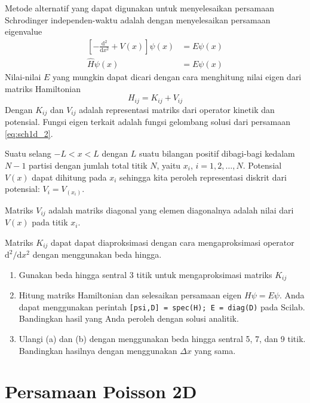 \documentclass[12pt,bahasa]{article}
\begin{document}
Metode alternatif
yang dapat digunakan untuk menyelesaikan persamaan
Schrodinger independen-waktu adalah dengan menyelesaikan
persamaan eigenvalue
\begin{align}
\left[-\frac{\mathrm{d}^2}{\mathrm{d}x^2} + V(x)\right]\psi(x) & = E\psi(x) \\
\hat{H}\psi(x) & = E \psi(x)
\end{align}
Nilai-nilai $E$ yang mungkin dapat dicari dengan cara menghitung
nilai eigen dari matriks Hamiltonian 
\begin{equation}
H_{ij} = K_{ij} + V_{ij}
\end{equation}
Dengan $K_{ij}$ dan $V_{ij}$ adalah representasi matriks dari operator
kinetik dan potensial.
Fungsi eigen terkait adalah fungsi gelombang solusi dari
persamaan \eqref{eq:sch1d_2}.

Suatu selang $-L < x < L$ dengan $L$ suatu bilangan positif
dibagi-bagi kedalam $N-1$ partisi dengan jumlah total titik $N$,
yaitu $x_{i}$, $i = 1, 2, \ldots, N$.
Potensial $V(x)$ dapat dihitung pada $x_{i}$ sehingga
kita peroleh representasi diskrit dari potensial:
$V_{i} = V_(x_{i})$.

Matriks $V_{ij}$ adalah matriks diagonal yang elemen diagonalnya adalah
nilai dari $V(x)$ pada titik $x_{i}$.

Matriks $K_{ij}$ dapat
dapat diaproksimasi dengan cara mengaproksimasi operator $\mathrm{d}^2/\mathrm{d}x^2$
dengan menggunakan beda hingga.

\begin{enumerate}[label=(\alph*)]
\item Gunakan beda hingga sentral 3 titik untuk mengaproksimasi matriks $K_{ij}$
\item Hitung matriks Hamiltonian dan selesaikan persamaan eigen $H\psi = E\psi$. Anda dapat
menggunakan perintah \texttt{[psi,D] = spec(H); E = diag(D)} pada Scilab.
Bandingkan hasil yang Anda peroleh dengan solusi analitik.
\item Ulangi (a) dan (b) dengan menggunakan beda hingga sentral 5, 7, dan 9 titik.
Bandingkan hasilnya dengan menggunakan $\Delta x$ yang sama.
\end{enumerate}


\section{Persamaan Poisson 2D}
\end{document}
